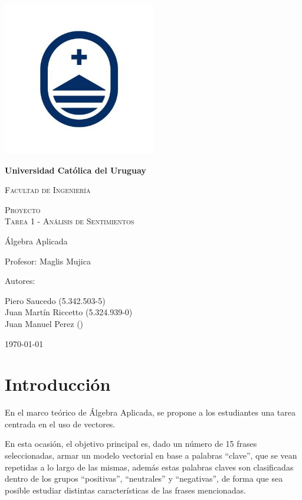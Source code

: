 \documentclass{article}
\begin{document}
\begin{titlepage}
    \centering
    {\includegraphics[width=0.5\textwidth]{logo2}\par}
    {\bfseries\LARGE Universidad Católica del Uruguay \par}
    \vspace{0.3cm}
    {\scshape\Large Facultad de Ingeniería \par}
    \vspace{0.3cm}
    {\scshape\Huge Proyecto \\Tarea 1 - Análisis de Sentimientos \par}
    \vspace{1cm}
    {\Large Álgebra Aplicada \par}
    {\Large Profesor: Maglis Mujica \par}
    \vfill
    {\Large Autores: \par}
    {\Large Piero Saucedo (5.342.503-5)\\Juan Martín Riccetto (5.324.939-0)\\Juan Manuel Perez () \par}
    \vfill
    {\Large \today \par}
\end{titlepage}

\section{Introducción}\label{sec:introduccion}
    En el marco teórico de Álgebra Aplicada, se propone a los estudiantes una tarea centrada en el uso de vectores.

    En esta ocasión, el objetivo principal es, dado un número de 15 frases seleccionadas, armar un modelo
    vectorial en base a palabras “clave”, que se vean repetidas a lo largo de las mismas, además estas palabras
    claves son clasificadas dentro de los grupos “positivas”, “neutrales” y “negativas”, de forma que sea posible
    estudiar distintas características de las frases mencionadas.
\end{document}
